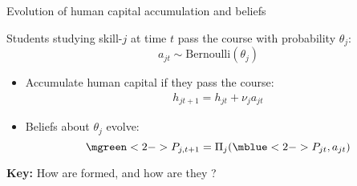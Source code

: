 \begin{frame}{Evolution of human capital accumulation and beliefs}


Students studying skill-$j$ at time $t$ pass the course with probability $\theta_j$:
\begin{equation*}
    a_{jt} \sim \text{Bernoulli} (\theta_j)
\end{equation*}
\vspace{-2.5ex}
\begin{itemize}
  \item 
  Accumulate human capital if they pass the course:
  \begin{align*}
    h_{jt+1} = h_{jt} + \nu_{j} a_{jt}
  \end{align*}
  \item 
  Beliefs about $\theta_j$ evolve:
  \begin{equation*}
      \mgreen<2->{P_{j,t+1}} = \Pi_j (\mblue<2->{P_{jt}},a_{jt})
  \end{equation*}
\end{itemize}

\pause
\vspace{5ex}
\textbf{Key:} How are   formed, and how are they ? 


\end{frame}

